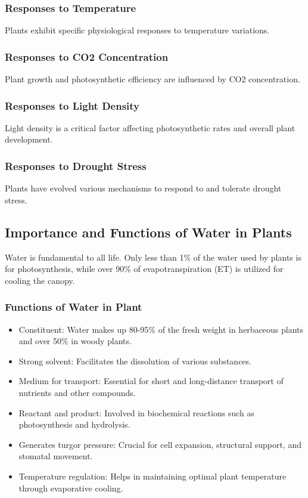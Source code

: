 \subsubsection{Responses to Temperature} 
Plants exhibit specific physiological responses to temperature variations.

\subsubsection{Responses to CO2 Concentration} 
Plant growth and photosynthetic efficiency are influenced by CO2 concentration.

\subsubsection{Responses to Light Density} 
Light density is a critical factor affecting photosynthetic rates and overall plant development.

\subsubsection{Responses to Drought Stress} 
Plants have evolved various mechanisms to respond to and tolerate drought stress.

\subsection{Importance and Functions of Water in Plants} 
Water is fundamental to all life. Only less than 1\% of the water used by plants is for photosynthesis, while over 90\% of evapotranspiration (ET) is utilized for cooling the canopy.

\subsubsection{Functions of Water in Plant} 
\begin{itemize} 
    \item Constituent: Water makes up 80-95\% of the fresh weight in herbaceous plants and over 50\% in woody plants. 
    \item Strong solvent: Facilitates the dissolution of various substances. 
    \item Medium for transport: Essential for short and long-distance transport of nutrients and other compounds. 
    \item Reactant and product: Involved in biochemical reactions such as photosynthesis and hydrolysis. 
    \item Generates turgor pressure: Crucial for cell expansion, structural support, and stomatal movement. 
    \item Temperature regulation: Helps in maintaining optimal plant temperature through evaporative cooling. 
\end{itemize}

